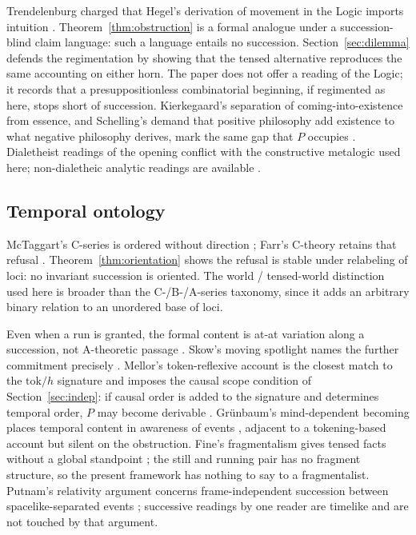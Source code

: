 \documentclass[11pt]{article}
\begin{document}
Trendelenburg charged that Hegel's derivation of movement in the Logic imports
intuition \cite{trendelenburg1870,hegel1832}.
Theorem~\ref{thm:obstruction} is a formal analogue under a succession-blind
claim language: such a language entails no succession.
Section~\ref{sec:dilemma} defends the regimentation by showing that the tensed
alternative reproduces the same accounting on either horn. The paper does not
offer a reading of the Logic; it records that a presuppositionless
combinatorial beginning, if regimented as here, stops short of succession.
Kierkegaard's separation of coming-into-existence from essence, and Schelling's
demand that positive philosophy add existence to what negative philosophy
derives, mark the same gap that \(P\) occupies
\cite{kierkegaard1844,schelling1994}. Dialetheist readings of the opening
\cite{priest2006} conflict with the constructive metalogic used here;
non-dialetheic analytic readings are available \cite{ficara2020,berto2007}.

\subsection{Temporal ontology}

McTaggart's C-series is ordered without direction \cite{mctaggart1908}; Farr's
C-theory retains that refusal \cite{farr2020}.
Theorem~\ref{thm:orientation} shows the refusal is stable under relabeling of
loci: no invariant succession is oriented. The world / tensed-world distinction
used here is broader than the C-/B-/A-series taxonomy, since it adds an
arbitrary binary relation to an unordered base of loci.

Even when a run is granted, the formal content is at-at variation along a
succession, not A-theoretic passage
\cite{williams1951,smart1949,broad1923,prior1959}. Skow's moving spotlight
names the further commitment precisely \cite{skow2015}. Mellor's
token-reflexive account is the closest match to the \(\mathrm{tok}/h\)
signature and imposes the causal scope condition of Section~\ref{sec:indep}: if
causal order is added to the signature and determines temporal order, \(P\) may
become derivable \cite{mellor1998}. Grünbaum's mind-dependent becoming places
temporal content in awareness of events \cite{grunbaum1967}, adjacent to a
tokening-based account but silent on the obstruction. Fine's fragmentalism
gives tensed facts without a global standpoint \cite{fine2005}; the still and
running pair has no fragment structure, so the present framework has nothing to
say to a fragmentalist. Putnam's relativity argument concerns
frame-independent succession between spacelike-separated events
\cite{putnam1967}; successive readings by one reader are timelike and are not
touched by that argument.
\end{document}
